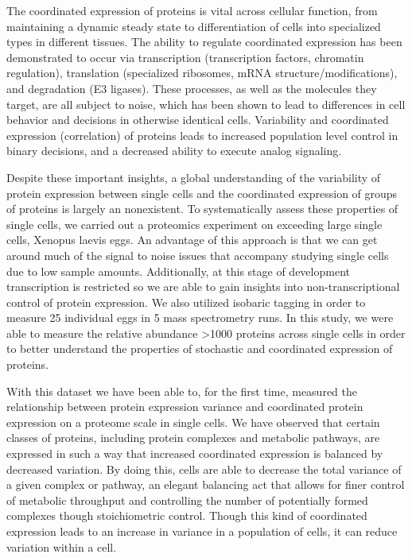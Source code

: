 \documentclass[11pt,twocolumn]{article}
\begin{document}
The coordinated expression of proteins is vital across cellular
function, from maintaining a dynamic steady state to differentiation of
cells into specialized types in different tissues. The ability to
regulate coordinated expression has been demonstrated to occur via
transcription (transcription factors, chromatin regulation), translation
(specialized ribosomes, mRNA structure/modifications), and degradation
(E3 ligases). These processes, as well as the molecules they target, are
all subject to noise, which has been shown to lead to differences in
cell behavior and decisions in otherwise identical cells. Variability
and coordinated expression (correlation) of proteins leads to increased
population level control in binary decisions, and a decreased ability to
execute analog signaling.

Despite these important insights, a global understanding of the
variability of protein expression between single cells and the
coordinated expression of groups of proteins is largely an nonexistent.
To systematically assess these properties of single cells, we carried
out a proteomics experiment on exceeding large single cells, Xenopus
laevis eggs. An advantage of this approach is that we can get around
much of the signal to noise issues that accompany studying single cells
due to low sample amounts. Additionally, at this stage of development
transcription is restricted so we are able to gain insights into
non-transcriptional control of protein expression. We also utilized
isobaric tagging in order to measure 25 individual eggs in 5 mass
spectrometry runs. In this study, we were able to measure the relative
abundance \textgreater{}1000 proteins across single cells in order to
better understand the properties of stochastic and coordinated
expression of proteins.

With this dataset we have been able to, for the first time, measured the
relationship between protein expression variance and coordinated protein
expression on a proteome scale in single cells. We have observed that
certain classes of proteins, including protein complexes and metabolic
pathways, are expressed in such a way that increased coordinated
expression is balanced by decreased variation. By doing this, cells are
able to decrease the total variance of a given complex or pathway, an
elegant balancing act that allows for finer control of metabolic
throughput and controlling the number of potentially formed complexes
though stoichiometric control. Though this kind of coordinated
expression leads to an increase in variance in a population of cells, it
can reduce variation within a cell.
\end{document}
